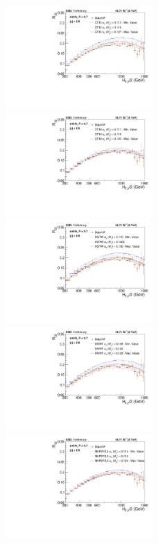 \begin{figure}[!htbp]
  \begin{center}
    \includegraphics[width=0.5\textwidth]{Plots_HT_2_150/Sensitivity_Pdfs/Sensitivity_ratio_32_CT10.pdf}%
    \includegraphics[width=0.5\textwidth]{Plots_HT_2_150/Sensitivity_Pdfs/Sensitivity_ratio_32_CT14.pdf}\\
    \includegraphics[width=0.5\textwidth]{Plots_HT_2_150/Sensitivity_Pdfs/Sensitivity_ratio_32_MSTW2008.pdf}%
    \includegraphics[width=0.5\textwidth]{Plots_HT_2_150/Sensitivity_Pdfs/Sensitivity_ratio_32_MMHT2014.pdf}\\
    \includegraphics[width=0.5\textwidth]{Plots_HT_2_150/Sensitivity_Pdfs/Sensitivity_ratio_32_NNPDF23.pdf}

\end{center}
\end{figure}
